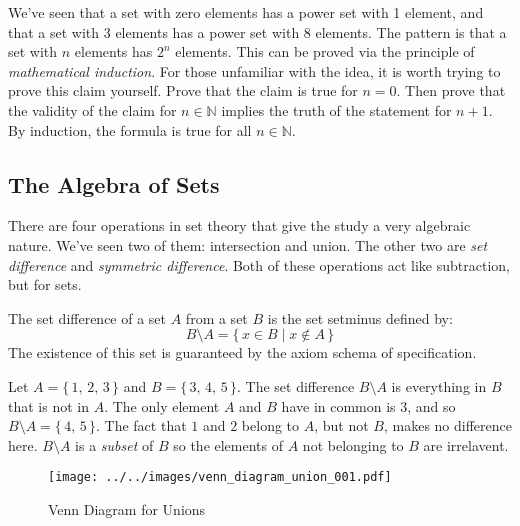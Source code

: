             We've seen that a set with zero elements has a power set with 1
            element, and that a set with 3 elements has a power set with 8
            elements. The pattern is that a set with $n$ elements has
            $2^{n}$ elements. This can be proved via the principle of
            \textit{mathematical induction}. For those unfamiliar with the
            idea, it is worth trying to prove this claim yourself. Prove
            that the claim is true for $n=0$. Then prove that the validity of
            the claim for $n\in\mathbb{N}$ implies the truth of the statement
            for $n+1$. By induction, the formula is true for all
            $n\in\mathbb{N}$.
        \subsection{The Algebra of Sets}
            There are four operations in set theory that give the study a very
            algebraic nature. We've seen two of them: intersection and union.
            The other two are \textit{set difference} and
            \textit{symmetric difference}. Both of these operations act like
            subtraction, but for sets.
            \begin{definition}
                The set difference of a set $A$ from a set $B$ is the set
                \gls{setminus} defined by:
                \begin{equation}
                    B\setminus{A}=\{\,x\in{B}\;|\;x\notin{A}\,\}
                \end{equation}
                The existence of this set is guaranteed by the axiom schema
                of specification.
            \end{definition}
            \begin{example}
                Let $A=\{\,1,\,2,\,3\,\}$ and $B=\{\,3,\,4,\,5\,\}$. The
                set difference $B\setminus{A}$ is everything in $B$ that is
                not in $A$. The only element $A$ and $B$ have in common is
                $3$, and so $B\setminus{A}=\{\,4,\,5\,\}$. The fact that
                $1$ and $2$ belong to $A$, but not $B$, makes no difference
                here. $B\setminus{A}$ is a \textit{subset} of $B$ so the
                elements of $A$ not belonging to $B$ are irrelavent.
            \end{example}
            \begin{figure}
                \centering
                \texttt{[image: ../../images/venn\_diagram\_union\_001.pdf]}
                \caption{Venn Diagram for Unions}
                \label{fig:venn_diagram_union_001}
            \end{figure}
